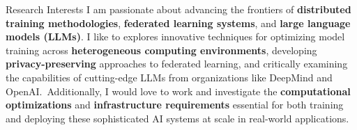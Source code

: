 
\begin{rSection}{Research Interests}
    I am passionate about advancing the frontiers of \textbf{distributed training methodologies}, 
    \textbf{federated learning systems}, and \textbf{large language models (LLMs)}. I like to explores
    innovative techniques for optimizing model training across \textbf{heterogeneous computing environments}, 
    developing \textbf{privacy-preserving} approaches to federated learning, and critically examining 
    the capabilities of cutting-edge LLMs from organizations like DeepMind and OpenAI.\ Additionally, 
    I would love to work and investigate the \textbf{computational optimizations} and \textbf{infrastructure requirements} essential 
    for both training and deploying these sophisticated AI systems at scale in real-world applications.
\end{rSection}